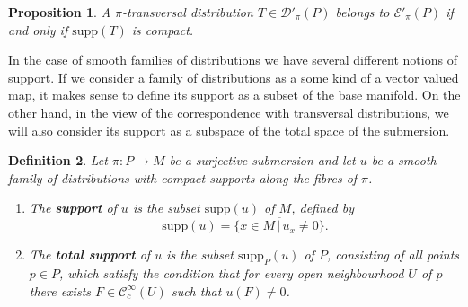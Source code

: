 \documentclass[a4paper]{amsart}
\newtheorem{dfn}{Definition}[section]
\newtheorem{prop}[dfn]{Proposition}
\newcommand{\cD}{\mathcal{D}}
\newcommand{\cE}{\mathcal{E}}
\newcommand{\supp}{\mathord{\mathrm{supp}}}
\newcommand{\Cc}{\mathord{\mathcal{C}^{\infty}_{c}}}
\begin{document}
\begin{prop}\label{characterization of distributions with compact support}
A $\pi$-transversal distribution $T\in\cD'_{\pi}(P)$ belongs to $\cE'_{\pi}(P)$ if and only if $\supp(T)$ is compact.
\end{prop}

In the case of smooth families of distributions we have several different notions of support. If we consider a family of distributions
as a some kind of a vector valued map, it makes sense to define its support as a subset of the base manifold. On the other hand, in the view of 
the correspondence with transversal distributions, we will also consider its support as a subspace of the total space of the submersion.

\begin{dfn}
Let $\pi:P\to M$ be a surjective submersion and let $u$ be a smooth family of distributions with compact supports
along the fibres of $\pi$. 
\begin{enumerate}
\item The \textbf{support} of $u$ is the subset $\supp(u)$ of $M$, defined by 
\[
\supp(u)=\overline{\{x\in M\,|\,u_{x}\neq 0\}}.
\]
\item The \textbf{total support} of $u$ is the subset $\supp_{P}(u)$ of $P$, consisting of all points 
$p\in P$, which satisfy the condition that for every open neighbourhood $U$ of $p$ there exists $F\in\Cc(U)$ such that $u(F)\neq 0$.
\end{enumerate}
\end{dfn}
\end{document}
